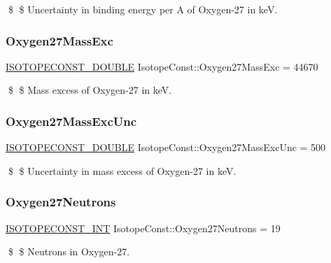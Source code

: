 \$ \$ Uncertainty in binding energy per A of Oxygen-\/27 in keV. \mbox{\label{group___isotope_const-_oxygen-_o27_ga4ba1f8867811a62b66301f7d336fa278}} 
\subsubsection{\texorpdfstring{Oxygen27\+Mass\+Exc}{Oxygen27MassExc}}
{\footnotesize\ttfamily \mbox{\hyperlink{group___isotope_const-_macros_ga8f45a7272ce02c0b4c65c44636ed719a}{I\+S\+O\+T\+O\+P\+E\+C\+O\+N\+S\+T\+\_\+\+D\+O\+U\+B\+LE}} Isotope\+Const\+::\+Oxygen27\+Mass\+Exc = 44670}

\$ \$ Mass excess of Oxygen-\/27 in keV. \mbox{\label{group___isotope_const-_oxygen-_o27_ga07c2c24e5a57a729ad6d24c1f1328b3d}} 
\subsubsection{\texorpdfstring{Oxygen27\+Mass\+Exc\+Unc}{Oxygen27MassExcUnc}}
{\footnotesize\ttfamily \mbox{\hyperlink{group___isotope_const-_macros_ga8f45a7272ce02c0b4c65c44636ed719a}{I\+S\+O\+T\+O\+P\+E\+C\+O\+N\+S\+T\+\_\+\+D\+O\+U\+B\+LE}} Isotope\+Const\+::\+Oxygen27\+Mass\+Exc\+Unc = 500}

\$ \$ Uncertainty in mass excess of Oxygen-\/27 in keV. \mbox{\label{group___isotope_const-_oxygen-_o27_gac8a7730809b4586dfd880bfcd8cd019f}} 
\subsubsection{\texorpdfstring{Oxygen27\+Neutrons}{Oxygen27Neutrons}}
{\footnotesize\ttfamily \mbox{\hyperlink{group___isotope_const-_macros_ga5f18360b3e99483a35c32d789e62621c}{I\+S\+O\+T\+O\+P\+E\+C\+O\+N\+S\+T\+\_\+\+I\+NT}} Isotope\+Const\+::\+Oxygen27\+Neutrons = 19}

\$ \$ Neutrons in Oxygen-\/27. \mbox{\label{group___isotope_const-_oxygen-_o27_gaf38ef6fd807de4f1c811acf97d4a37cb}} 
